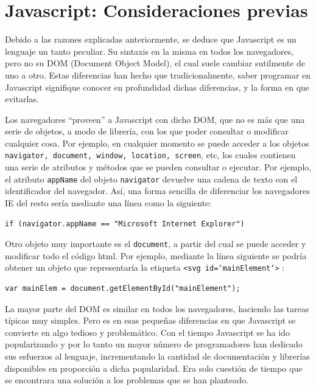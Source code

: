 \section{Javascript: Consideraciones previas}
Debido a las razones explicadas anteriormente, se deduce que Javascript es un lenguaje un tanto peculiar. Su sintaxis en la misma en todos los navegadores, pero no su DOM (Document Object Model), el cual suele cambiar sutilmente de uno a otro. Estas diferencias han hecho que tradicionalmente, saber programar en Javascript signifique conocer en profundidad dichas diferencias, y la forma en que evitarlas.

Los navegadores ``proveen'' a Javascript con dicho DOM, que no es más que una serie de objetos, a modo de librería, con los que poder consultar o modificar cualquier cosa. Por ejemplo, en cualquier momento se puede acceder a los objetos \texttt{navigator, document, window, location, screen}, etc, los cuales contienen una serie de atributos y métodos que se pueden consultar o ejecutar. Por ejemplo, el atributo \texttt{appName} del objeto \texttt{navigator} devuelve una cadena de texto con el identificador del navegador. Así, una forma sencilla de diferenciar los navegadores IE del resto sería mediante una línea como la siguiente:

\begin{verbatim}
if (navigator.appName == "Microsoft Internet Explorer") 
\end{verbatim}

Otro objeto muy importante es el \texttt{document}, a partir del cual se puede acceder y modificar todo el código html. Por ejemplo, mediante la línea siguiente se podría obtener un objeto que representaría la etiqueta \texttt{<svg id=`mainElement`>} :

\begin{verbatim}
var mainElem = document.getElementById("mainElement");
\end{verbatim}

La mayor parte del DOM es similar en todos los navegadores, haciendo las tareas típicas muy simples. Pero es en esas pequeñas diferencias en que Javascript se convierte en algo tedioso y problemático. Con el tiempo Javascript se ha ido popularizando y por lo tanto un mayor número de programadores han dedicado sus esfuerzos al lenguaje, incrementando la cantidad de documentación y librerías disponibles en proporción a dicha popularidad. Era solo cuestión de tiempo que se encontrara una solución a los problemas que se han planteado.

